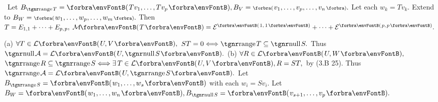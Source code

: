\BulletPointX\Tips \,\,\,Let $B_{\range T}=\Par{Tv_1,\dots,Tv_p},B_V=\BigPar{v_1,\dots,v_p,\dots,v_n}.$ Let each $w_k=Tv_k.$\TextB{\vspace{2pt}}\IndentTips{}
Extend to $B_W=\BigPar{w_1,\dots,w_p,\dots,w_m}.$ Then $T=E_{1,1}+\dots+E_{p,\;\!p},\;\Mt{T}=\mEnt{1,\,1}+\dots+\mEnt{p,\;\!p}.$
\SepLine



(a) $\forall T\in\Lm{U,V},$ $ST=0\Longleftrightarrow\range T\subseteq\null S.$ Thus $\null\mA=\Lm{U,\null S}.$\parSol{\vspace{2pt}}
(b) $\forall R\in\Lm{U,W},$ $\range R\subseteq\range S \Longleftrightarrow\exists\,T\in\Lm{U,V},R=ST,$ by (3.B 25).\parSol{\Hb}
Thus $\range\mA=\Lm{U,\range S}.$\PfEnd\vspace{4pt}\quad
\Or Let $B_{\range S}=\Par{w_1,\dots,w_s}$ with each $w_i=Sv_i.$ Let $B_W=\Par{w_1,\dots,w_n},B_{\null S}=\Par{v_{s+1},\dots,v_p}.$\par\vspace{0pt}\quad
